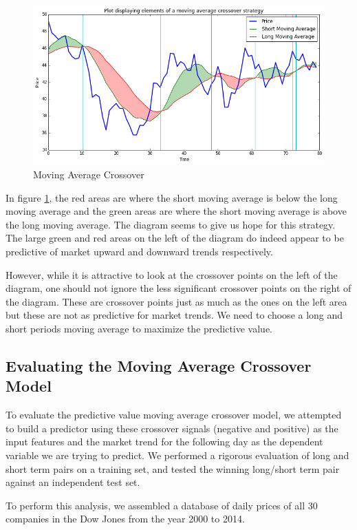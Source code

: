 \documentclass{report}
\begin{document}
\begin{figure}[H]
	\caption{Moving Average Crossover}
	\centerline{\includegraphics[width=\textwidth]{vis/macrossover.png}}
	\label{fig:macrossover}
\end{figure}

In figure \ref{fig:macrossover}, the red areas are where the short moving average is below the long moving average and the green areas are where the short moving average is above the long moving average. The diagram seems to give us hope for this strategy. The large green and red areas on the left of the diagram do indeed appear to be predictive of market upward and downward trends respectively. 

However, while it is attractive to look at the crossover points on the left of the diagram, one should not ignore the less significant crossover points on the right of the diagram. These are crossover points just as much as the ones on the left area but these are not as predictive for market trends. We need to choose a long and short periods moving average to maximize the predictive value.

\subsection{Evaluating the Moving Average Crossover Model}

To evaluate the predictive value moving average crossover model, we attempted to build a predictor using these crossover signals (negative and positive) as the input features and the market trend for the following day as the dependent variable we are trying to predict. We performed a rigorous evaluation of long and short term pairs on a training set, and tested the winning long/short term pair against an independent test set.

To perform this analysis, we assembled a database of daily prices of all 30 companies in the Dow Jones from the year 2000 to 2014.
\end{document}
